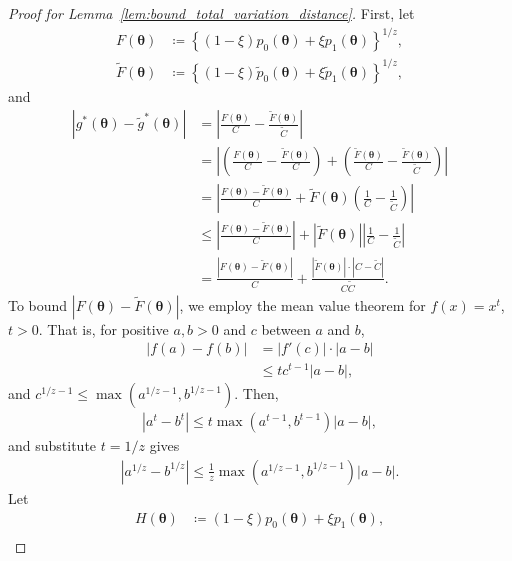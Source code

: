 \documentclass[12pt]{article}
\begin{document}
\begin{proof}[Proof for Lemma~\ref{lem:bound_total_variation_distance}]
    First, let
    \begin{align*}
        F(\bm{\theta}) &\coloneqq \left\{(1 - \xi) p_0(\bm{\theta}) + \xi p_1(\bm{\theta}) \right\}^{1 / z}, \\
        \tilde{F}(\bm{\theta}) &\coloneqq \left\{(1 - \xi) \tilde{p}_0(\bm{\theta}) + \xi \tilde{p}_1(\bm{\theta}) \right\}^{1 / z},
    \end{align*}
    and
    \begin{align*}
        \left|g^*(\bm{\theta}) - \tilde{g}^*(\bm{\theta})\right| &= \left|\frac{F(\bm{\theta})}{C} - \frac{\tilde{F}(\bm{\theta})}{\tilde{C}}\right| \\
        &= \left| \left(\frac{F(\bm{\theta})}{C} - \frac{\tilde{F}(\bm{\theta})}{C}\right) + \left(\frac{\tilde{F}(\bm{\theta})}{C} - \frac{\tilde{F}(\bm{\theta})}{\tilde{C}}\right)\right| \\
        &= \left| \frac{F(\bm{\theta}) - \tilde{F}(\bm{\theta})}{C} + \tilde{F}(\bm{\theta})\left(\frac{1}{C} - \frac{1}{\tilde{C}}\right) \right| \\
        &\leq \left| \frac{F(\bm{\theta}) - \tilde{F}(\bm{\theta})}{C} \right| + \left| \tilde{F}(\bm{\theta}) \right| \left| \frac{1}{C} - \frac{1}{\tilde{C}} \right| \\
        &= \frac{\left| F(\bm{\theta}) - \tilde{F}(\bm{\theta}) \right|}{C} + \frac{|\tilde{F}(\bm{\theta})| \cdot |C - \tilde{C}|}{C \tilde{C}}.
    \end{align*}
    To bound $\left|F(\bm{\theta}) - \tilde{F}(\bm{\theta})\right|$, we employ the mean value theorem for $f(x) = x^{t}$, $t > 0$.
    That is, for positive $a, b > 0$ and $c$ between $a$ and $b$,
    \begin{align*}
        |f(a) - f(b)| &= |f'(c)| \cdot |a - b| \\
        &\leq t c^{t - 1} |a - b|,
    \end{align*}
    and $c^{1 / z - 1} \leq \max(a^{1 / z - 1}, b^{1 / z - 1})$.
    Then,
    \begin{align*}
        \left|a^{t} - b^{t}\right| \leq t \max\left(a^{t - 1}, b^{t - 1}\right) |a - b|,
    \end{align*}
    and substitute $t = 1/z$ gives
    \begin{align*}
        \left|a^{1/z} - b^{1/z}\right| \leq \frac{1}{z} \max\left(a^{1/z - 1}, b^{1/z - 1}\right) |a - b|.
    \end{align*}
    Let
    \begin{align*}
        H(\bm{\theta}) &\coloneqq (1 - \xi) p_0(\bm{\theta}) + \xi p_1(\bm{\theta}), \\

\end{align*}
\end{proof}
\end{document}
